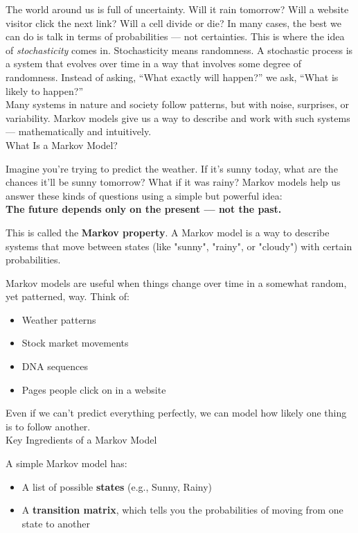 \documentclass{book}
\begin{document}
The world around us is full of uncertainty. Will it rain tomorrow? Will a website visitor click the next link? Will a cell divide or die? In many cases, the best we can do is talk in terms of probabilities — not certainties. This is where the idea of \textit{stochasticity} comes in. Stochasticity means randomness. A stochastic process is a system that evolves over time in a way that involves some degree of randomness. Instead of asking, “What exactly will happen?” we ask, “What is likely to happen?”\\

Many systems in nature and society follow patterns, but with noise, surprises, or variability. Markov models give us a way to describe and work with such systems — mathematically and intuitively.\\

What Is a Markov Model?

Imagine you're trying to predict the weather. If it’s sunny today, what are the chances it’ll be sunny tomorrow? What if it was rainy? Markov models help us answer these kinds of questions using a simple but powerful idea:\\

\textbf{The future depends only on the present — not the past.}

This is called the \textbf{Markov property}. A Markov model is a way to describe systems that move between states (like "sunny", "rainy", or "cloudy") with certain probabilities.

Markov models are useful when things change over time in a somewhat random, yet patterned, way. Think of:

\begin{itemize}
  \item Weather patterns
  \item Stock market movements
  \item DNA sequences
  \item Pages people click on in a website
\end{itemize}

Even if we can’t predict everything perfectly, we can model how likely one thing is to follow another.\\

Key Ingredients of a Markov Model

A simple Markov model has:
\begin{itemize}
  \item A list of possible \textbf{states} (e.g., Sunny, Rainy)
  \item A \textbf{transition matrix}, which tells you the probabilities of moving from one state to another
\end{itemize}
\end{document}
